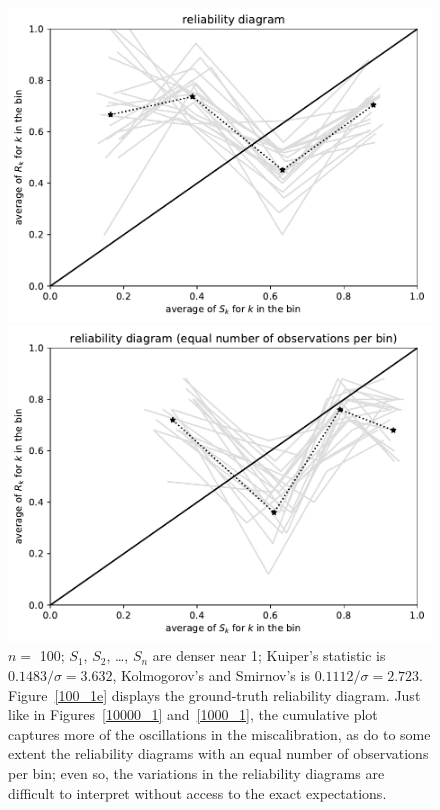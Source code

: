 \documentclass{article}
\begin{document}
\begin{figure}
\begin{centering}
\parbox{\imsize}{\includegraphics[width=\imsize]
                {./codes/unweighted/100_4_2_1/equiprob.pdf}}
\quad\quad
\parbox{\imsize}{\includegraphics[width=\imsize]
                {./codes/unweighted/100_4_2_1/equisamp.pdf}}

\end{centering}
\caption{$n =$ 100; $S_1$, $S_2$, \dots, $S_n$ are denser near 1;
         Kuiper's statistic is $0.1483 / \sigma = 3.632$,
         Kolmogorov's and Smirnov's is $0.1112 / \sigma = 2.723$.
Figure~\ref{100_1e} displays the ground-truth reliability diagram.
Just like in Figures~\ref{10000_1} and~\ref{1000_1},
the cumulative plot captures more of the oscillations in the miscalibration,
as do to some extent the reliability diagrams with an equal number
of observations per bin; even so, the variations in the reliability diagrams
are difficult to interpret without access to the exact expectations.
}
\label{100_1}
\end{figure}
\end{document}
